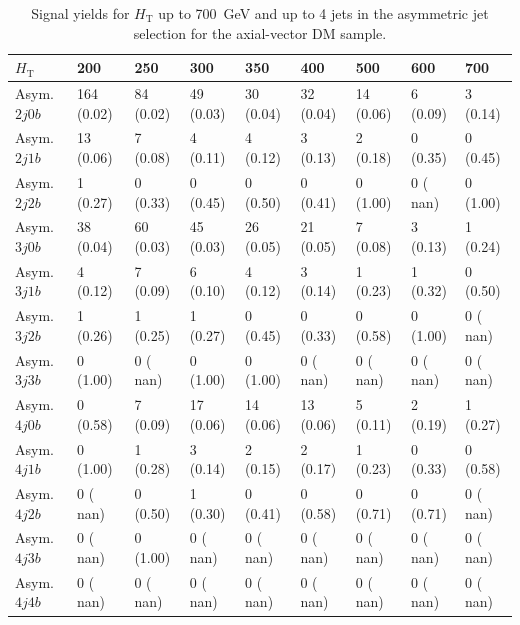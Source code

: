 \begin{table}[h]
\begin{tabular}{lllllllll}
\hline \hline
$H_\textrm{T}$                 &     200 &            250 &             300&             350&             400&             500&             600&             700  \\\hline\hline
Asym. $2j 0b$&     164 (0.02)&       84 (0.02)&       49 (0.03)&       30 (0.04)&       32 (0.04)&       14 (0.06)&        6 (0.09)&        3 (0.14) \\\hline
Asym. $2j 1b$&      13 (0.06)&        7 (0.08)&        4 (0.11)&        4 (0.12)&        3 (0.13)&        2 (0.18)&        0 (0.35)&        0 (0.45) \\\hline
Asym. $2j 2b$&       1 (0.27)&        0 (0.33)&        0 (0.45)&        0 (0.50)&        0 (0.41)&        0 (1.00)&        0 ( nan)&        0 (1.00) \\\hline
Asym. $3j 0b$&      38 (0.04)&       60 (0.03)&       45 (0.03)&       26 (0.05)&       21 (0.05)&        7 (0.08)&        3 (0.13)&        1 (0.24) \\\hline
Asym. $3j 1b$&       4 (0.12)&        7 (0.09)&        6 (0.10)&        4 (0.12)&        3 (0.14)&        1 (0.23)&        1 (0.32)&        0 (0.50) \\\hline
Asym. $3j 2b$&       1 (0.26)&        1 (0.25)&        1 (0.27)&        0 (0.45)&        0 (0.33)&        0 (0.58)&        0 (1.00)&        0 ( nan) \\\hline
Asym. $3j 3b$&       0 (1.00)&        0 ( nan)&        0 (1.00)&        0 (1.00)&        0 ( nan)&        0 ( nan)&        0 ( nan)&        0 ( nan) \\\hline
Asym. $4j 0b$&       0 (0.58)&        7 (0.09)&       17 (0.06)&       14 (0.06)&       13 (0.06)&        5 (0.11)&        2 (0.19)&        1 (0.27) \\\hline
Asym. $4j 1b$&       0 (1.00)&        1 (0.28)&        3 (0.14)&        2 (0.15)&        2 (0.17)&        1 (0.23)&        0 (0.33)&        0 (0.58) \\\hline
Asym. $4j 2b$&       0 ( nan)&        0 (0.50)&        1 (0.30)&        0 (0.41)&        0 (0.58)&        0 (0.71)&        0 (0.71)&        0 ( nan) \\\hline
Asym. $4j 3b$&       0 ( nan)&        0 (1.00)&        0 ( nan)&        0 ( nan)&        0 ( nan)&        0 ( nan)&        0 ( nan)&        0 ( nan) \\\hline
Asym. $4j 4b$&       0 ( nan)&        0 ( nan)&        0 ( nan)&        0 ( nan)&        0 ( nan)&        0 ( nan)&        0 ( nan)&        0 ( nan) \\\hline
\hline
\end{tabular}
\caption{Signal yields for $H_\textrm{T}$ up to 700~GeV and up to 4 jets in the asymmetric jet selection for the axial-vector DM sample.}
\label{tab:sig_yields_AVDM_asym}
\end{table}





